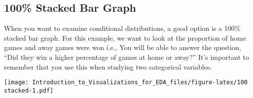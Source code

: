 \documentclass[]{article}
\newenvironment{Shaded}{\begin{snugshade}}{\end{snugshade}}
\newcommand{\DataTypeTok}[1]{\textcolor[rgb]{0.13,0.29,0.53}{#1}}
\newcommand{\KeywordTok}[1]{\textcolor[rgb]{0.13,0.29,0.53}{\textbf{#1}}}
\newcommand{\NormalTok}[1]{#1}
\newcommand{\OperatorTok}[1]{\textcolor[rgb]{0.81,0.36,0.00}{\textbf{#1}}}
\newcommand{\StringTok}[1]{\textcolor[rgb]{0.31,0.60,0.02}{#1}}
\begin{document}
\hypertarget{stacked-bar-graph}{%
\subsection{100\% Stacked Bar Graph}\label{stacked-bar-graph}}

When you want to examine conditional distributions, a good option is a
100\% stacked bar graph. For this example, we want to look at the
proportion of home games and away games were won i.e., You will be able
to answer the question, ``Did they win a higher percentage of games at
home or away?'' It's important to remember that you use this when
studying two categorical variables.

\begin{Shaded}
\end{Shaded}

\texttt{[image: Introduction\_to\_Visualizations\_for\_EDA\_files/figure-latex/100 stacked-1.pdf]}
\end{document}
